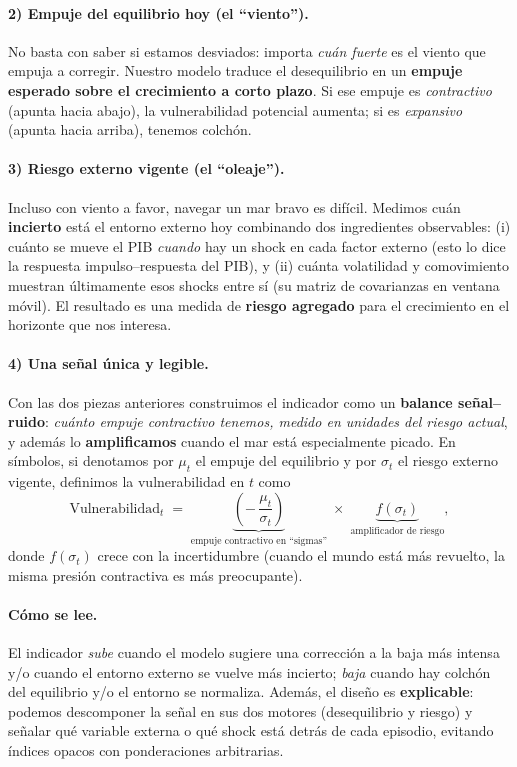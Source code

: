 \documentclass[11pt,a4paper]{article}
\newcommand{\1}{\mathbf{1}}
\begin{document}
\paragraph{2) Empuje del equilibrio hoy (el ``viento'').}
No basta con saber si estamos desviados: importa \emph{cuán fuerte} es el viento que empuja a corregir. 
Nuestro modelo traduce el desequilibrio en un \textbf{empuje esperado sobre el crecimiento a corto plazo}. 
Si ese empuje es \emph{contractivo} (apunta hacia abajo), la vulnerabilidad potencial aumenta; si es \emph{expansivo} (apunta hacia arriba), tenemos colchón.

\paragraph{3) Riesgo externo vigente (el ``oleaje'').}
Incluso con viento a favor, navegar un mar bravo es difícil. 
Medimos cuán \textbf{incierto} está el entorno externo hoy combinando dos ingredientes observables: 
(i) cuánto se mueve el PIB \emph{cuando} hay un shock en cada factor externo (esto lo dice la respuesta impulso--respuesta del PIB), y 
(ii) cuánta volatilidad y comovimiento muestran últimamente esos shocks entre sí (su matriz de covarianzas en ventana móvil). 
El resultado es una medida de \textbf{riesgo agregado} para el crecimiento en el horizonte que nos interesa.

\paragraph{4) Una señal única y legible.}
Con las dos piezas anteriores construimos el indicador como un \textbf{balance señal--ruido}: 
\emph{cuánto empuje contractivo tenemos, medido en unidades del riesgo actual}, y además lo \textbf{amplificamos} cuando el mar está especialmente picado. 
En símbolos, si denotamos por $\mu_t$ el empuje del equilibrio y por $\sigma_t$ el riesgo externo vigente, definimos la vulnerabilidad en $t$ como
\[
\text{Vulnerabilidad}_t \;=\; \underbrace{\left(-\,\frac{\mu_t}{\sigma_t}\right)}_{\text{empuje contractivo en ``sigmas''}} 
\;\times\; 
\underbrace{f(\sigma_t)}_{\text{amplificador de riesgo}},
\]
donde $f(\sigma_t)$ crece con la incertidumbre (cuando el mundo está más revuelto, la misma presión contractiva es más preocupante).

\paragraph{Cómo se lee.}
El indicador \emph{sube} cuando el modelo sugiere una corrección a la baja más intensa y/o cuando el entorno externo se vuelve más incierto; 
\emph{baja} cuando hay colchón del equilibrio y/o el entorno se normaliza. 
Además, el diseño es \textbf{explicable}: podemos descomponer la señal en sus dos motores (desequilibrio y riesgo) y señalar qué variable externa o qué shock está detrás de cada episodio, evitando índices opacos con ponderaciones arbitrarias.
\end{document}
